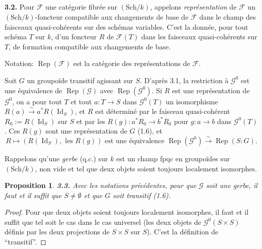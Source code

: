 \documentclass[12pt,a4paper]{article}
\theoremstyle{plain}
\newtheorem{proposition}[theorem]{Proposition}
\theoremstyle{definition}
\theoremstyle{remark}
\DeclareMathOperator{\Id}{Id}
\DeclareMathOperator{\Rep}{Rep}
\begin{document}
\subsection{}

\textbf{3.2.} Pour $\mathcal{F}$ une catégorie fibrée sur $(\mathrm{Sch}/k)$, appelons \emph{représentation} de $\mathcal{F}$ un $(\mathrm{Sch}/k)$-foncteur compatible aux changements de base de $\mathcal{F}$ dans le champ des faisceaux quasi-cohérents sur des schémas variables. C'est la donnée, pour tout schéma $T$ sur $k$, d'un foncteur $R$ de $\mathcal{F}(T)$ dans les faisceaux quasi-cohérents sur $T$, de formation compatible aux changements de base.

Notation: $\Rep(\mathcal{F})$ est la catégorie des représentations de $\mathcal{F}$.

Soit $G$ un groupoïde transitif agissant sur $S$. D'après 3.1, la restriction à $\mathcal{G}^0$ est une équivalence de $\Rep(\mathcal{G})$ avec $\Rep(\mathcal{G}^0)$. Si $R$ est une représentation de $\mathcal{G}^0$, on a pour tout $T$ et tout $a : T \to S$ dans $\mathcal{G}^0(T)$ un isomorphisme $R(a) \xrightarrow{\sim} a^* R(\Id_S)$, et $R$ est déterminé par le faisceau quasi-cohérent $R_0 := R(\Id_S)$ sur $S$ et par les $R(g) : a^* R_0 \to b^* R_0$ pour $g : a \to b$ dans $\mathcal{G}^0(T)$. Ces $R(g)$ sont une représentation de $G$ (1.6), et
\begin{equation}\label{eq:3.2.1}
R \mapsto (R(\Id_S), \text{ les } R(g)) \text{ est une équivalence } \Rep(\mathcal{G}^0) \xrightarrow{\sim} \Rep(S:G).
\end{equation}

Rappelons qu'une \emph{gerbe} (q.c.) sur $k$ est un champ fpqc en groupoïdes sur $(\mathrm{Sch}/k)$, non vide et tel que deux objets soient toujours localement isomorphes.

\begin{proposition}\label{prop:3.3}
\textbf{3.3.} Avec les notations précédentes, pour que $\mathcal{G}$ soit une gerbe, il faut et il suffit que $S \neq \emptyset$ et que $G$ soit transitif (1.6).
\end{proposition}

\begin{proof}
Pour que deux objets soient toujours localement isomorphes, il faut et il suffit que tel soit le cas dans le cas universel (les deux objets de $\mathcal{G}^0(S \times S)$ définis par les deux projections de $S \times S$ sur $S$). C'est la définition de ``transitif''.
\end{proof}
\end{document}
